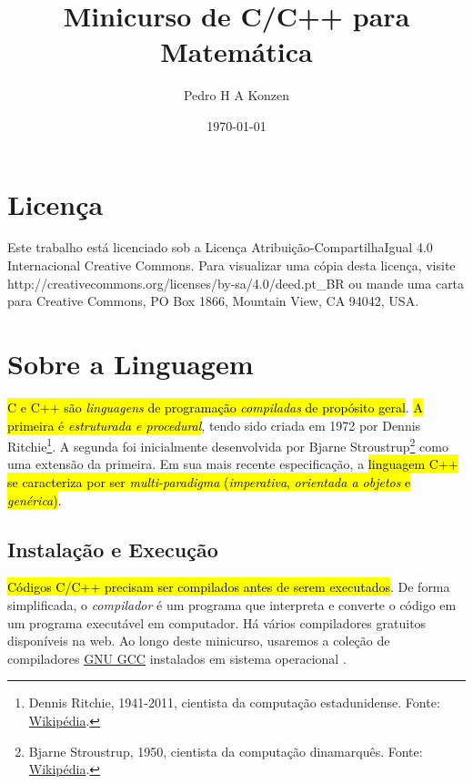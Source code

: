\documentclass[12pt]{article}
\begin{document}
\title{Minicurso de C/C++ para Matemática}
\author{Pedro H A Konzen}
\date{\today}

\maketitle

\tableofcontents

\section{Licença}\label{sec_licenca}

Este trabalho está licenciado sob a Licença Atribuição-CompartilhaIgual 4.0 Internacional Creative Commons. Para visualizar uma cópia desta licença, visite http://creativecommons.org/licenses/by-sa/4.0/deed.pt\_BR ou mande uma carta para Creative Commons, PO Box 1866, Mountain View, CA 94042, USA.


\section{Sobre a Linguagem}\label{sec_sobrepy}

\hl{C e C++ são \emph{linguagens} de programação \emph{compiladas} de propósito geral}. \hl{A primeira é \emph{estruturada e procedural}}, tendo sido criada em 1972 por Dennis Ritchie\footnote{Dennis Ritchie, 1941-2011, cientista da computação estadunidense. Fonte: \href{https://pt.wikipedia.org/wiki/Dennis_Ritchie}{Wikipédia}.}. A segunda foi inicialmente desenvolvida por Bjarne Stroustrup\footnote{Bjarne Stroustrup, 1950, cientista da computação dinamarquês. Fonte: \href{https://pt.wikipedia.org/wiki/Bjarne_Stroustrup}{Wikipédia}.} como uma extensão da primeira. Em sua mais recente especificação, a \hl{linguagem C++ se caracteriza por ser \emph{multi-paradigma} (\emph{imperativa}, \emph{orientada a objetos} e \emph{genérica})}.

\subsection{Instalação e Execução}

\hl{Códigos C/C++ precisam ser compilados antes de serem executados}. De forma simplificada, o \emph{compilador} é um programa que interpreta e converte o código em um programa executável em computador. Há vários compiladores gratuitos disponíveis na web. Ao longo deste minicurso, usaremos a coleção de compiladores \href{https://gcc.gnu.org/}{GNU GCC} instalados em sistema operacional {\linux}.
\end{document}
